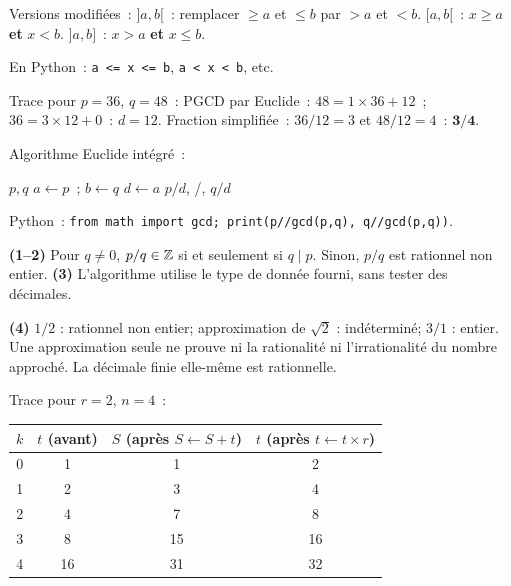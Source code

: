 Versions modifi\'ees~:
$]a,b[$~: remplacer $\geq a$ et $\leq b$ par $>a$ et $<b$.
$[a,b[$~: $x\geq a$ \textbf{et} $x<b$.
$]a,b]$~: $x>a$ \textbf{et} $x\leq b$.

En Python~: \texttt{a <= x <= b}, \texttt{a < x < b}, etc.


Trace pour $p=36$, $q=48$~:
PGCD par Euclide~: $48=1\times36+12$~; $36=3\times12+0$~: $d=12$.
Fraction simplifi\'ee~: $36/12=3$ et $48/12=4$~: $\mathbf{3/4}$.

Algorithme Euclide int\'egr\'e~:
\begin{algorithm}[H]
\caption{PGCD + simplification}
\Lire $p, q$\;
$a\leftarrow p$~; $b\leftarrow q$\;
$d\leftarrow a$\;
\Afficher $p/d$, \og/\fg, $q/d$\;
\end{algorithm}

Python~: \texttt{from math import gcd; print(p//gcd(p,q), q//gcd(p,q))}.


\textbf{(1--2)} Pour $q\ne0$, $p/q\in\mathbb{Z}$ si et seulement si $q\mid p$.
Sinon, $p/q$ est rationnel non entier.
\textbf{(3)} L'algorithme utilise le type de donn\'ee fourni, sans tester des d\'ecimales.
\begin{algorithm}[H]
\caption{Classifier selon une donn\'ee exacte ou approch\'ee}
\end{algorithm}
\textbf{(4)} $1/2$ : rationnel non entier; approximation de $\sqrt2$ :
ind\'etermin\'e; $3/1$ : entier.
Une approximation seule ne prouve ni la rationalit\'e ni l'irrationalit\'e
du nombre approch\'e. La d\'ecimale finie elle-m\^eme est rationnelle.


Trace pour $r=2$, $n=4$~:
\begin{center}
\renewcommand{\arraystretch}{1.2}
\begin{tabular}{cccc}
\toprule
$k$ & $t$ (avant) & $S$ (apr\`es $S\leftarrow S+t$) & $t$ (apr\`es $t\leftarrow t\times r$) \\
\midrule
0 & 1 & 1 & 2 \\
1 & 2 & 3 & 4 \\
2 & 4 & 7 & 8 \\
3 & 8 & 15 & 16 \\
4 & 16 & 31 & 32 \\
\bottomrule
\end{tabular}
\end{center}


